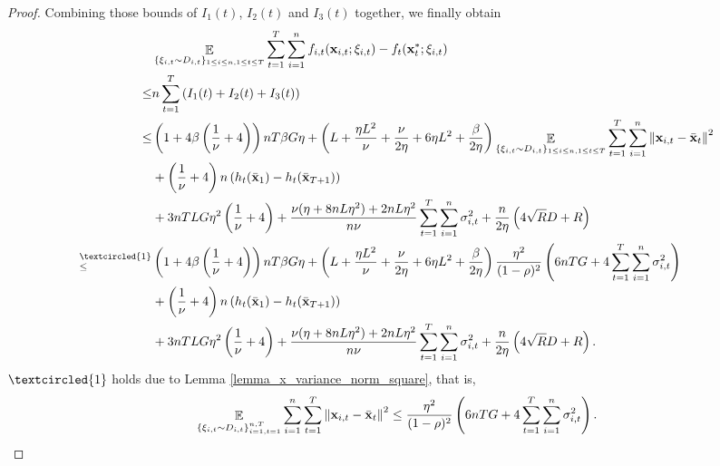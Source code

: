\documentclass{article}
\begin{document}
\begin{proof}
Combining those bounds of $I_1(t)$, $I_2(t)$ and $I_3(t)$ together, we finally obtain
\begin{align}
\nonumber
& \EE_{ \{\xi_{i,t} \sim D_{i,t}\}_{1\le i \le n, 1\le t \le T} } \sum_{t=1}^T\sum_{i=1}^n f_{i,t}(\x_{i,t};\xi_{i,t}) - f_t(\x_t^\ast;\xi_{i,t}) \\ \nonumber
\le & n \sum_{t=1}^T \lrincir{ I_1(t) + I_2(t) + I_3(t) } \\ \nonumber
\le & \lrincir{1 + 4\beta\lrincir{\frac{1}{\nu}+4}}nT\beta G \eta + \lrincir{ L + \frac{\eta L^2}{\nu} + \frac{\nu}{2\eta} + 6\eta L^2  + \frac{\beta}{2\eta} }\EE_{ \{\xi_{i,t} \sim D_{i,t}\}_{1\le i \le n, 1\le t \le T} }\sum_{t=1}^T\sum_{i=1}^n\lrnorm{\x_{i,t} - \bar{\x}_t }^2 \\ \nonumber 
&+ \lrincir{\frac{1}{\nu} + 4}n\lrincir{h_t(\bar{\x}_1) - h_t(\bar{\x}_{T+1})}  \\ \nonumber 
& + 3nTLG\eta^2\lrincir{ \frac{1}{\nu} + 4 } + \frac{\nu(\eta + 8nL\eta^2) + 2nL\eta^2}{n\nu} \sum_{t=1}^T\sum_{i=1}^n\sigma_{i,t}^2  + \frac{n}{2\eta}\lrincir{ 4\sqrt{R}D + R  } \\ \nonumber
\refabovecir{\le}{\textcircled{1}} & \lrincir{1 + 4\beta\lrincir{\frac{1}{\nu}+4}}nT\beta G \eta + \lrincir{ L + \frac{\eta L^2}{\nu} + \frac{\nu}{2\eta} + 6\eta L^2  + \frac{\beta}{2\eta} }\frac{\eta^2}{(1-\rho)^2}   \lrincir{ 6nTG + 4\sum_{t=1}^T\sum_{i=1}^n \sigma_{i,t}^2 } \\ \nonumber 
&+ \lrincir{\frac{1}{\nu} + 4}n\lrincir{h_t(\bar{\x}_1) - h_t(\bar{\x}_{T+1})}  \\ \nonumber 
& + 3nTLG\eta^2\lrincir{ \frac{1}{\nu} + 4 } + \frac{\nu(\eta + 8nL\eta^2) + 2nL\eta^2}{n\nu} \sum_{t=1}^T\sum_{i=1}^n\sigma_{i,t}^2  + \frac{n}{2\eta}\lrincir{ 4\sqrt{R}D + R  }.
\end{align}  $\textcircled{1}$ holds due to Lemma \ref{lemma_x_variance_norm_square}, that is, 
\begin{align}
\nonumber
\mathop{\mathbb{E}}_{ \{ \xi_{i,t} \sim D_{i,t} \}_{i=1,t=1}^{n,T} } \sum_{i=1}^n\sum_{t=1}^T \left\lVert{\bf x}_{i,t} - \bar{{\bf x}}_t\right\rVert^2 \le \frac{\eta^2}{(1-\rho)^2}   \left(  6nTG + 4\sum_{t=1}^T\sum_{i=1}^n \sigma_{i,t}^2  \right).
\end{align}







\end{proof}
\end{document}
